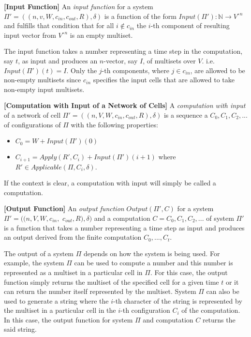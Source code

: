 \documentclass[a4paper]{article}
\theoremstyle{definition}
\newcommand{\ra}{\rightarrow}
\begin{document}

\label{def-input} \textbf{[Input Function]} An \emph{input function} for a system 
$\Pi'=((n,v,W,c_{in},c_{out},R),\delta)$  is a function of the form $Input(\Pi'): \mathbb{N} \ra 
{V^{\circ}}^{n}$ and fulfills that condition that for all $i \notin c_{in}$ the $i$-th component of 
resulting input vector from ${V^{\circ}}^n$ is an empty multiset.

The input function takes a number representing a time step in the computation, say $t$, as input 
and produces an $n$-vector, say $I$, of multisets over $V$. i.e. $Input(\Pi')(t) = I$. Only the
$j$-th components, where $j \in c_{in}$, are allowed to be non-empty multisets since $c_{in}$
specifies the input cells that are allowed to take non-empty input multisets.


\label{def-comp2}\textbf{[Computation with Input of a Network of Cells]} A 
\emph{computation with input} of a network of cell $\Pi' = ((n,V,W,c_{in},c_{out},R),\delta)$ is a 
sequence a $C_0,C_1,C_2,...$ of configurations of $\Pi$ with the following properties:
\begin{itemize}
\item $C_0 = W + Input(\Pi')(0)$
\item $C_{i+1} = Apply(R',C_i) + Input(\Pi')(i+1)$ where $R' \in Applicable(\Pi, C_i, \delta)$.
\end{itemize}

If the context is clear, a computation with input will simply be called a computation.


\label{def-output} \textbf{[Output Function]} An \emph{output function} 
$Output(\Pi',C)$ for a system $\Pi' = ((n,V,W,c_{in},$ $c_{out},R),\delta)$ and a computation 
$C=C_0,C_1,C_2,...$ of system $\Pi'$ is a function that takes a number representing a time step
as input and produces an output derived from the finite computation $C_0,...,C_t$.

The output of a system $\Pi$ depends on how the system is being used. For example, the system $\Pi$
can be used to compute a number and this number is represented as a multiset in a particular cell in
$\Pi$. For this case, the output function simply returns the multiset of the specified cell for a 
given time $t$ or it can return the number itself represented by the multiset. System $\Pi$ can also 
be used to generate a string where the $i$-th character of the string is represented by the multiset 
in a particular cell in the $i$-th configuration $C_i$ of the computation. In this case, the output 
function for system $\Pi$ and computation $C$ returns the said string.
\end{document}
